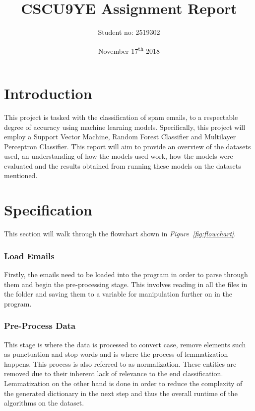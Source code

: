 \documentclass[11pt, a4paper]{article}
\title{CSCU9YE Assignment Report}
\author{Student no: 2519302}
\date{November 17\textsuperscript{th} 2018}
\begin{document}
\begin{titlepage}
\maketitle
\clearpage\thispagestyle{empty}
\end{titlepage}
\doublespacing
{}
\tableofcontents
\thispagestyle{empty}
\newpage
\singlespacing

\section{Introduction}

This project is tasked with the classification of spam emails, to a respectable degree of accuracy using machine learning models. Specifically, this project will employ a Support Vector Machine, Random Forest Classifier and Multilayer Perceptron Classifier. This report will aim to provide an overview of the datasets used, an understanding of how the models used work, how the models were evaluated and the results obtained from running these models on the datasets mentioned.  

\section{Specification}

This section will walk through the flowchart shown in \emph{Figure~\ref{fig:flowchart}}.

\subsubsection*{Load Emails}

Firstly, the emails need to be loaded into the program in order to parse through them and begin the pre-processing stage. This involves reading in all the files in the folder and saving them to a variable for manipulation further on in the program. 

\subsubsection*{Pre-Process Data}

This stage is where the data is processed to convert case, remove elements such as punctuation and stop words and is where the process of lemmatization happens. This process is also referred to as normalization. These entities are removed due to their inherent lack of relevance to the end classification. Lemmatization on the other hand is done in order to reduce the complexity of the generated dictionary in the next step and thus  the overall runtime of the algorithms on the dataset.
\end{document}
